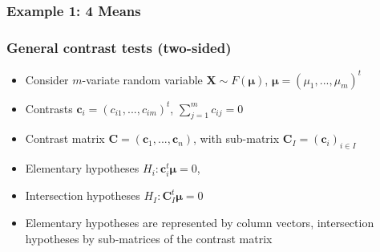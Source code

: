 \documentclass[bigger]{beamer}
\newcommand{\bs}[1]{\bm{#1}}
\begin{document}
\begin{frame}
\frametitle{Example 1: 4 Means}

\end{frame}



\begin{frame}
\frametitle{General contrast tests (two-sided)}
\begin{itemize}

\item Consider $m$-variate random variable $\bs{X} \sim F(\bs{\mu})$, $\bs{\mu} = (\mu_1,...,\mu_m)^t$

\item Contrasts $\bs{c}_i = (c_{i1},...,c_{im})^t$, $\sum_{j = 1}^m
  c_{ij} = 0$
\item Contrast matrix  $\bs{C} = \left( \bs{c}_1,...,\bs{c}_n\right)$,
  with sub-matrix $\bs{C}_I = \left( \bs{c}_i \right)_{i \in
    I}$
\item Elementary hypotheses $H_i: \bs{c}_i^t\bs{\mu} = 0$,
\item Intersection hypotheses $H_I: \bs{C}_I^t\bs{\mu} = 0$

\item Elementary hypotheses are represented by column vectors,
  intersection hypotheses by sub-matrices of the contrast matrix

\end{itemize} %
\end{frame}
\end{document}
